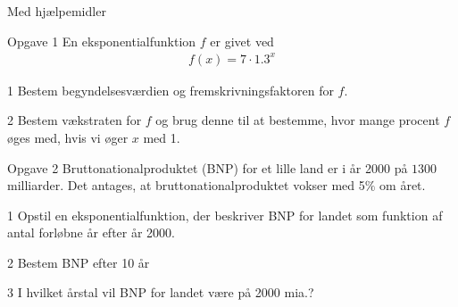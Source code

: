 
\begin{center}
	\LARGE Med hjælpemidler
\end{center}
\begin{opgavetekst}{Opgave 1}
	En eksponentialfunktion $f$ er givet ved
	\begin{align*}
		f(x) = 7\cdot 1.3^x
	\end{align*}	
\end{opgavetekst}
\begin{delopgave}{}{1}
	Bestem begyndelsesværdien og fremskrivningsfaktoren for $f$.
\end{delopgave}
\begin{delopgave}{}{2}
	Bestem vækstraten for $f$ og brug denne til at bestemme, hvor mange procent $f$ øges med, hvis vi øger $x$ med 1.
\end{delopgave}	

\begin{opgavetekst}{Opgave 2}
	Bruttonationalproduktet (BNP) for et lille land er i år 2000 på $1300$ milliarder. Det antages, at 
	bruttonationalproduktet vokser med 5$\%$ om året. 
\end{opgavetekst}
\begin{delopgave}{}{1}
	Opstil en eksponentialfunktion, der beskriver BNP for landet som funktion af antal forløbne år efter år 2000.
\end{delopgave}	
\begin{delopgave}{}{2}
	Bestem BNP efter 10 år
\end{delopgave}
\begin{delopgave}{}{3}
	I hvilket årstal vil BNP for landet være på 2000 mia.?
\end{delopgave}

